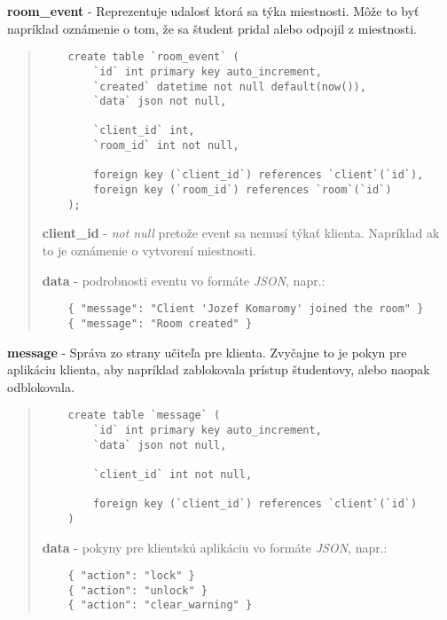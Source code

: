 \documentclass{article}
\newcommand{\filedesc}[1]{\vspace{0.3cm} \noindent \textbf{#1}}
\begin{document}
\filedesc{room{\_}event} - Reprezentuje udalosť ktorá sa týka miestnosti. Môže to byť napríklad oznámenie o tom, že sa študent pridal alebo odpojil z miestnosti.

\begin{quote}

  \begin{verbatim}
    create table `room_event` (
        `id` int primary key auto_increment,
        `created` datetime not null default(now()),
        `data` json not null,

        `client_id` int,
        `room_id` int not null,

        foreign key (`client_id`) references `client`(`id`),
        foreign key (`room_id`) references `room`(`id`)
    );
  \end{verbatim}

  \filedesc{client{\_}id} - \emph{not null} pretože event sa nemusí týkať klienta. Napríklad ak to je oznámenie o vytvorení miestnosti.

  \filedesc{data} - podrobnosti eventu vo formáte \emph{JSON}, napr.:

  \begin{verbatim}
    { "message": "Client 'Jozef Komaromy' joined the room" }
    { "message": "Room created" }
  \end{verbatim}

\end{quote}

\filedesc{message} - Správa zo strany učiteľa pre klienta. Zvyčajne to je pokyn pre aplikáciu klienta, aby napríklad zablokovala prístup študentovy, alebo naopak odblokovala.

\begin{quote}
  \begin{verbatim}
    create table `message` (
        `id` int primary key auto_increment,
        `data` json not null,

        `client_id` int not null,

        foreign key (`client_id`) references `client`(`id`)
    )
  \end{verbatim}
  
  \filedesc{data} - pokyny pre klientskú aplikáciu vo formáte \emph{JSON}, napr.:

  \begin{verbatim}
    { "action": "lock" }
    { "action": "unlock" }
    { "action": "clear_warning" }
  \end{verbatim}

\end{quote}
\end{document}
